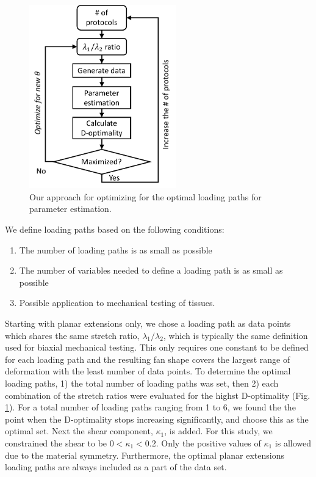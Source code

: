 \begin{figure}
\centering
\includegraphics[width=2.5in]{Images/chapter5/optimaldesign}
\caption{Our approach for optimizing for the optimal loading paths for parameter estimation.}
\label{fig:optimaldesign}
\end{figure}

    
    We define loading paths based on the following conditions: 
\begin{enumerate}
\item The number of loading paths is as small as possible
\item The number of variables needed to define a loading path is as small as possible
\item Possible application to mechanical testing of tissues.
\end{enumerate} 
    Starting with planar extensions only, we chose a loading path as data points which shares the same stretch ratio, $\lambda_1/\lambda_2$, which is typically the same definition used for biaxial mechanical testing. This only requires one constant to be defined for each loading path and the resulting fan shape covers the largest range of deformation with the least number of data points. To determine the optimal loading paths, 1) the total number of loading paths was set, then 2) each combination of the stretch ratios were evaluated for the highst D-optimality (Fig. \ref{fig:optimaldesign}). For a total number of loading paths ranging from 1 to 6, we found the the point when the D-optimality stops increasing significantly, and choose this as the optimal set. Next the shear component, $\kappa_1$, is added. For this study, we constrained the shear to be $0<\kappa_1<0.2$. Only the positive values of $\kappa_1$ is allowed due to the material symmetry. Furthermore, the optimal planar extensions loading paths are always included as a part of the data set.














